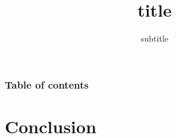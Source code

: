 \documentclass[9pt, xcolor=dvipsnames]{beamer}
\title[short]{title}
\subtitle{subtitle}
\begin{document}


\begin{frame}%
	\frametitle{Table of contents}
	\tableofcontents[hideallsubsections]   %
\end{frame}

% 


\section{Conclusion}


\end{document}
